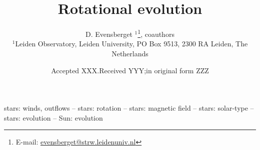 \documentclass[a4paper,fleqn,usenatbib]{mnras}
\title[Rotational evolution]
    {Rotational evolution}
\author[D. Evensberget et al.]{
    D. Evensberget \orcidlink{0000-0001-7810-8028}\(^{1}\)\thanks{E-mail: \href{mailto:evensberget@strw.leidenuniv.nl}{evensberget@strw.leidenuniv.nl}},
    coauthors
    \\
    \(^{1}\)Leiden Observatory, Leiden University, PO Box 9513, 2300 RA Leiden, The Netherlands
}
\date{Accepted XXX.\@ Received YYY;\@ in original form ZZZ}
\begin{document}
\label{firstpage}  %
\pagerange{\pageref{firstpage}--\pageref{lastpage}}
\maketitle
%
\begin{abstract}
    
\end{abstract}

\begin{keywords}
    stars: winds, outflows --
    stars: rotation --
    stars: magnetic field --
    stars: solar-type --
    stars: evolution --
    Sun: evolution
\end{keywords}











\appendix



\bsp	%
\label{lastpage} %

\clearpage
\end{document}
